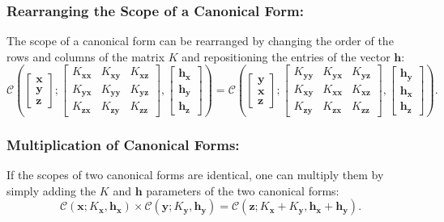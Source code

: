 \documentclass[12pt,oneside,openany,a4paper, %
afrikaans,english,
]{memoir}
\numberwithin{equation}{chapter}
\begin{document}
\subsubsection{Rearranging the Scope of a Canonical Form:}
The scope of a canonical form can be rearranged by changing the order of the rows and columns of the matrix $K$ and repositioning the entries of the vector $\bm{h}$:
\begin{equation}
\mathcal{C}\left(
\begin{bmatrix}
\bm{x}\\
\bm{y}\\
\bm{z}
\end{bmatrix};
\begin{bmatrix}
K_{\bm{xx}} & K_{\bm{xy}} & K_{\bm{xz}}\\
K_{\bm{yx}} & K_{\bm{yy}} & K_{\bm{yz}}\\
K_{\bm{zx}} & K_{\bm{zy}} & K_{\bm{zz}}
\end{bmatrix},
\begin{bmatrix}
\bm{h_x}\\
\bm{h_y}\\
\bm{h_z}
\end{bmatrix}
\right)
=
\mathcal{C}\left(
\begin{bmatrix}
\bm{y}\\
\bm{x}\\
\bm{z}
\end{bmatrix};
\begin{bmatrix}
K_{\bm{yy}} & K_{\bm{yx}} & K_{\bm{yz}}\\
K_{\bm{xy}} & K_{\bm{xx}} & K_{\bm{xz}}\\
K_{\bm{zy}} & K_{\bm{zx}} & K_{\bm{zz}}
\end{bmatrix},
\begin{bmatrix}
\bm{h_y}\\
\bm{h_x}\\
\bm{h_z}
\end{bmatrix}
\right).
\end{equation}
\subsubsection{Multiplication of Canonical Forms:}
If the scopes of two canonical forms are identical, one can multiply them by simply adding the $K$ and $\bm{h}$ parameters of the two canonical forms:
\begin{equation}\label{eq:10}
\mathcal{C} (\bm{x}; K_{\bm{x}},\bm{h_x}) \times \mathcal{C} (\bm{y}; K_{\bm{y}},\bm{h_y})= \mathcal{C} (\bm{z};K_{\bm{x}} + K_{\bm{y}}, \bm{h_x} + \bm{h_y}).
\end{equation}
\end{document}
